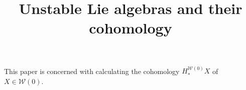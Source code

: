 \documentclass[11pt]{amsart}
\title[Unstable Lie algebras and their cohomology]{Unstable Lie algebras and their cohomology}
\theoremstyle{plain}
\theoremstyle{definition}
\newcommand{\calW}{\mathcal{W}}
\theoremstyle{plain}
\begin{document}
\newcommand{\todo}[2]{\begin{shaded}\begin{itemize}
\setlength{\parindent}{.25in}
\item[{\Large$\smash\diamondsuit$}] #1
\ifblank{#2}{}{\tiny\begin{itemize}
\setlength{\parindent}{.25in}
\item #2
\end{itemize}}
\end{itemize}\end{shaded}
}
\newcommand{\tododone}[2]{}
\newcommand{\todoeasy}[2]{\begin{shaded}\begin{itemize}
\setlength{\parindent}{.25in}
\item[{\Large$\smash\spadesuit$}] #1
\ifblank{#2}{}{\tiny\begin{itemize}
\setlength{\parindent}{.25in}
\item #2
\end{itemize}}
\end{itemize}\end{shaded}
}

\begin{Contents Page}
\tableofcontents
\end{Contents Page}

\begin{Intro}
This paper is concerned with calculating the cohomology $H^{\calW(0)}_*X$ of $X\in \calW(0)$.
\end{Intro}
\end{document}
